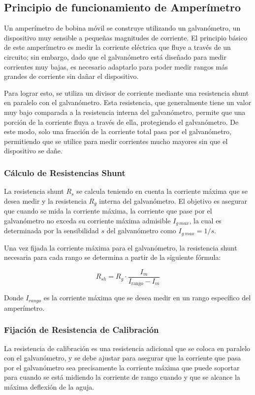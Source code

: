 
\subsection{Principio de funcionamiento de Amperímetro}
Un amperímetro de bobina móvil se construye utilizando un galvanómetro, un dispositivo muy sensible a pequeñas magnitudes de corriente. El principio básico de este amperímetro es medir la corriente eléctrica que fluye a través de un circuito; sin embargo, dado que el galvanómetro está diseñado para medir corrientes muy bajas, es necesario adaptarlo para poder medir rangos más grandes de corriente sin dañar el dispositivo.

Para lograr esto, se utiliza un divisor de corriente mediante una resistencia shunt en paralelo con el galvanómetro. Esta resistencia, que generalmente tiene un valor muy bajo comparada a la resistencia interna del galvanómetro, permite que una porción de la corriente fluya a través de ella, protegiendo el galvanómetro. De este modo, solo una fracción de la corriente total pasa por el galvanómetro, permitiendo que se utilice para medir corrientes mucho mayores sin que el dispositivo se dañe.

\subsubsection{Cálculo de Resistencias Shunt}
La resistencia shunt $R_s$ se calcula teniendo en cuenta la corriente máxima que se desea medir y la resistencia $R_g$ interna del galvanómetro. El objetivo es asegurar que cuando se mida la corriente máxima, la corriente que pase por el galvanómetro no exceda su corriente máxima admisible $I_{g\ max}$, la cual es determinada por la sensibilidad $s$ del galvanómetro como $I_{g\ max} = 1/s$.

Una vez fijada la corriente máxima para el galvanómetro, la resistencia shunt necesaria para cada rango se determina a partir de la siguiente fórmula:

\begin{equation}
    R_{sh} = R_g \cdot \frac{I_m}{I_{\text{rango}} - I_m}
    \label{eq:Rsh}
\end{equation}

Donde $I_{rango}$ es la corriente máxima que se desea medir en un rango específico del amperímetro.

\subsubsection{Fijación de Resistencia de Calibración}
La resistencia de calibración es una resistencia adicional que se coloca en paralelo con el galvanómetro, y se debe ajustar para asegurar que la corriente que pasa por el galvanómetro sea precisamente la corriente máxima que puede soportar para cuando se está midiendo la corriente de rango cuando y que se alcance la máxima deflexión de la aguja.


